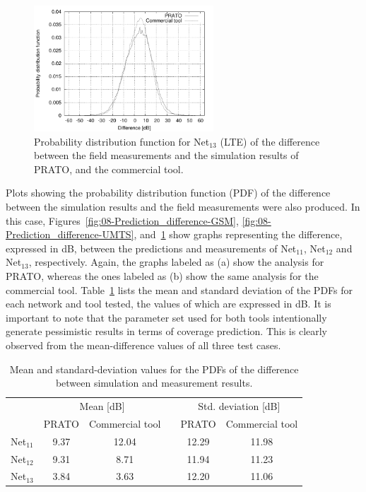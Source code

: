 \begin{figure}[h]
\centering

\includegraphics[width=0.6\textwidth]{08-real_network_planning/img/lte_diff}

\caption{Probability distribution function for Net$_{13}$ (LTE) of the difference
between the field measurements and the simulation results of PRATO,
and the commercial tool.\label{fig:08-Prediction_difference-LTE}}
\end{figure}


Plots showing the probability distribution function (PDF)
of the difference between the simulation results and the field measurements
were also produced. In this case, Figures~\ref{fig:08-Prediction_difference-GSM},
\ref{fig:08-Prediction_difference-UMTS}, and~\ref{fig:08-Prediction_difference-LTE}
show graphs representing the difference, expressed in dB, between
the predictions and measurements of Net$_{11}$, Net$_{12}$ and Net$_{13}$,
respectively. Again, the graphs labeled as (a) show the analysis for
PRATO, whereas the ones labeled as (b) show the same analysis for
the commercial tool. Table~\ref{tab:08-PDF_properties} lists the
mean and standard deviation of the PDFs for each network and tool
tested, the values of which are expressed in dB. It is important to
note that the parameter set used for both tools intentionally generate
pessimistic results in terms of coverage prediction. This is clearly
observed from the mean-difference values of all three test cases.

\begin{table}
\centering

\caption{Mean and standard-deviation values for the PDFs of the difference
between simulation and measurement results.\textit{\emph{ }}\textit{\label{tab:08-PDF_properties}}}


\begin{tabular}{cccccc}
\cmidrule{2-6} 
 & \multicolumn{2}{c}{Mean {[}dB{]}} &  & \multicolumn{2}{c}{Std. deviation {[}dB{]}}\tabularnewline\addlinespace
\cmidrule{2-6} 
 & PRATO & Commercial tool &  & PRATO & Commercial tool\tabularnewline\addlinespace
\midrule
Net$_{11}$ & 9.37 & 12.04 &  & 12.29 & 11.98\tabularnewline
Net$_{12}$ & 9.31 & 8.71 &  & 11.94 & 11.23\tabularnewline
Net$_{13}$ & 3.84 & 3.63 &  & 12.20 & 11.06\tabularnewline
\bottomrule
\end{tabular}
\end{table}


